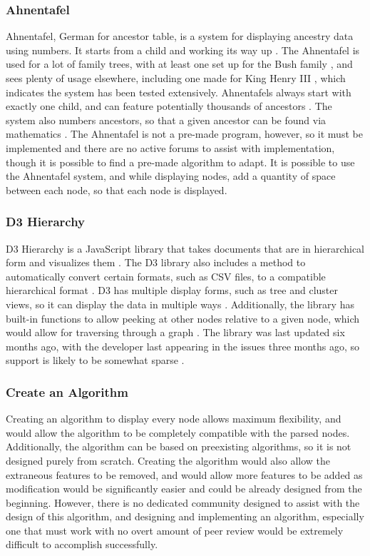 \documentclass[onecolumn, draftclsnofoot,10pt, compsoc]{IEEEtran}
\begin{document}
\subsubsection{Ahnentafel}
Ahnentafel, German for ancestor table, is a system for displaying ancestry data using numbers. It starts from a child and working its way up \cite{J5}. The Ahnentafel is used for a lot of family trees, with at least one set up for the Bush family \cite{J5}, and sees plenty of usage elsewhere, including one made for King Henry III \cite{J6}, which indicates the system has been tested extensively. Ahnentafels always start with exactly one child, and can feature potentially thousands of ancestors \cite{J5}. The system also numbers ancestors, so that a given ancestor can be found via mathematics \cite{J5}. The Ahnentafel is not a pre-made program, however, so it must be implemented and there are no active forums to assist with implementation, though it is possible to find a pre-made algorithm to adapt. It is possible to use the Ahnentafel system, and while displaying nodes, add a quantity of space between each node, so that each node is displayed.

\subsubsection{D3 Hierarchy}
D3 Hierarchy is a JavaScript library that takes documents that are in hierarchical form and visualizes them \cite{J7}. The D3 library also includes a method to automatically convert certain formats, such as CSV files, to a compatible hierarchical format \cite{J7}. D3 has multiple display forms, such as tree and cluster views, so it can display the data in multiple ways \cite{J7}. Additionally, the library has built-in functions to allow peeking at other nodes relative to a given node, which would allow for traversing through a graph  \cite{J7}. The library was last updated six months ago, with the developer last appearing in the issues three months ago, so support is likely to be somewhat sparse \cite{J7}.


\subsubsection{Create an Algorithm}
Creating an algorithm to display every node allows maximum flexibility, and would allow the algorithm to be completely compatible with the parsed nodes. Additionally, the algorithm can be based on preexisting algorithms, so it is not designed purely from scratch. Creating the algorithm would also allow the extraneous features to be removed, and would allow more features to be added as modification would be significantly easier and could be already designed from the beginning. However, there is no dedicated community designed to assist with the design of this algorithm, and designing and implementing an algorithm, especially one that must work with no overt amount of peer review would be extremely difficult to accomplish successfully.
\end{document}
